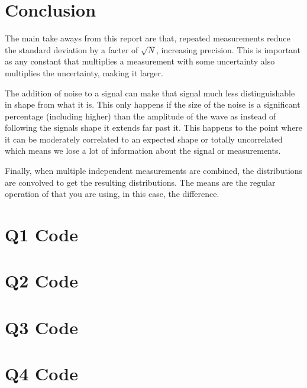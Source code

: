 \documentclass[a4paper, 12pt]{article}
\begin{document}
    \section{Conclusion}
        The main take aways from this report are that, repeated measurements reduce the standard deviation by a facter of $\sqrt{N}$, increasing precision. This is important as any constant that multiplies a measurement with some uncertainty also multiplies the uncertainty, making it larger.
        \par
        The addition of noise to a signal can make that signal much less distinguishable in shape from what it is. This only happens if the size of the noise is a significant percentage (including higher) than the amplitude of the wave as instead of following the signals shape it extends far past it. This happens to the point where it can be moderately correlated to an expected shape or totally uncorrelated which means we lose a lot of information about the signal or measurements.
        \par
        Finally, when multiple independent measurements are combined, the distributions are convolved to get the resulting distributions. The means are the regular operation of that you are using, in this case, the difference.
    
    

    \begin{appendices}
        \section{Q1 Code}
            
        \section{Q2 Code}
            
        \section{Q3 Code}
            
        \section{Q4 Code}
            
    \end{appendices}
\end{document}
